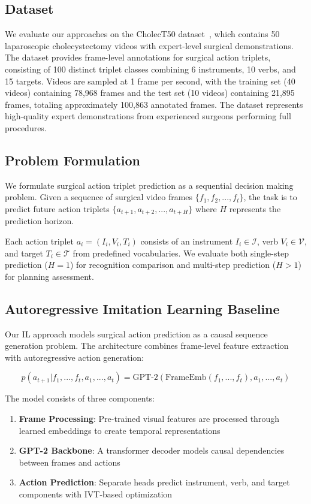 \documentclass[runningheads]{llncs}
\begin{document}
\subsection{Dataset}

We evaluate our approaches on the CholecT50 dataset~\cite{nwoye2022cholect50}, which contains 50 laparoscopic cholecystectomy videos with expert-level surgical demonstrations. The dataset provides frame-level annotations for surgical action triplets, consisting of 100 distinct triplet classes combining 6 instruments, 10 verbs, and 15 targets. Videos are sampled at 1 frame per second, with the training set (40 videos) containing 78,968 frames and the test set (10 videos) containing 21,895 frames, totaling approximately 100,863 annotated frames. The dataset represents high-quality expert demonstrations from experienced surgeons performing full procedures.

\subsection{Problem Formulation}

We formulate surgical action triplet prediction as a sequential decision making problem. Given a sequence of surgical video frames $\{f_1, f_2, ..., f_t\}$, the task is to predict future action triplets $\{a_{t+1}, a_{t+2}, ..., a_{t+H}\}$ where $H$ represents the prediction horizon.

Each action triplet $a_i = (I_i, V_i, T_i)$ consists of an instrument $I_i \in \mathcal{I}$, verb $V_i \in \mathcal{V}$, and target $T_i \in \mathcal{T}$ from predefined vocabularies. We evaluate both single-step prediction ($H=1$) for recognition comparison and multi-step prediction ($H>1$) for planning assessment.

\subsection{Autoregressive Imitation Learning Baseline}

Our IL approach models surgical action prediction as a causal sequence generation problem. The architecture combines frame-level feature extraction with autoregressive action generation:

\begin{equation}
p(a_{t+1}|f_1, ..., f_t, a_1, ..., a_t) = \text{GPT-2}(\text{FrameEmb}(f_1, ..., f_t), a_1, ..., a_t)
\end{equation}

The model consists of three components:
\begin{enumerate}
\item \textbf{Frame Processing}: Pre-trained visual features are processed through learned embeddings to create temporal representations
\item \textbf{GPT-2 Backbone}: A transformer decoder models causal dependencies between frames and actions
\item \textbf{Action Prediction}: Separate heads predict instrument, verb, and target components with IVT-based optimization
\end{enumerate}
\end{document}
